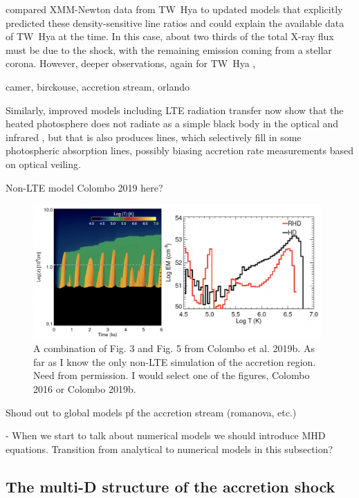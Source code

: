 \citet{Guenther_2007} compared XMM-Newton data from TW~Hya to updated models that explicitly predicted these density-sensitive line ratios and could explain the available data of TW~Hya at the time. In this case, about two thirds of the total X-ray flux must be due to the shock, with the remaining emission coming from a stellar corona. However, deeper observations, again for TW~Hya \cite{Brickhouse_2010}, 

camer, birckouse, accretion stream, orlando

Similarly, improved models including LTE radiation transfer now show that the heated photosphere does not radiate as a simple black body in the optical and infrared \cite{Dodin_2012,Dodin_2013}, but that is also produces lines, which selectively fill in some photospheric absorption lines, possibly biasing accretion rate measurements based on optical veiling.

Non-LTE model Colombo 2019 here?

\begin{figure}
    \centering
    \includegraphics[width=11cm]{figs/colombo2019b.png}
    \caption{A combination of Fig. 3 and Fig. 5 from Colombo et al. 2019b. As far as I know the only non-LTE simulation of the accretion region. Need from permission. I would select one of the figures, Colombo 2016 or Colombo 2019b.}
    \label{fig:colombo2016}
\end{figure}

Shoud out to global models pf the accretion stream (romanova, etc.)

- When we start to talk about numerical models we should introduce MHD equations. Transition from analytical to numerical models in this subsection?


\subsection{The multi-D structure of the accretion shock}


